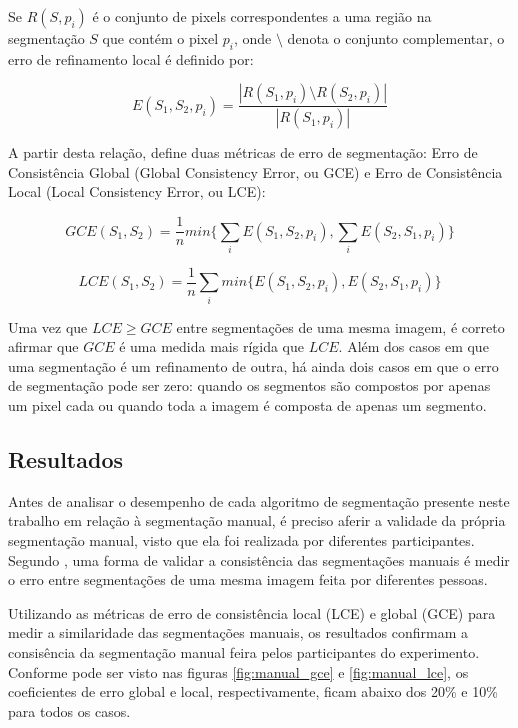 Se $R(S,p_i)$ é o conjunto de pixels correspondentes a uma região na segmentação $S$ que contém o pixel $p_i$, onde $\setminus$ denota o conjunto complementar, o erro de refinamento local é definido por:

\begin{equation}
	\displaystyle E(S_1,S_2,p_i) = \frac{|R(S_1,p_i) \setminus R(S_2,p_i)|}{|R(S_1,p_i)|}
\end{equation}


A partir desta relação,  define duas métricas de erro de segmentação: Erro de Consistência Global (Global Consistency Error, ou GCE) e Erro de Consistência Local (Local Consistency Error, ou LCE):

\begin{equation}
	\displaystyle GCE(S_1,S_2) = \frac{1}{n} min \biggl\{ \sum_{i} E(S_1,S_2,p_i), \sum_{i} E(S_2,S_1,p_i) \biggr\}
\end{equation}

\begin{equation}
	\displaystyle LCE(S_1,S_2) = \frac{1}{n} \sum_{i} min \biggl\{ E(S_1,S_2,p_i), E(S_2,S_1,p_i) \biggr\}
\end{equation}

Uma vez que $LCE \geq GCE$ entre segmentações de uma mesma imagem, é correto afirmar que $GCE$ é uma medida mais rígida que $LCE$. Além dos casos em que uma segmentação é um refinamento de outra, há ainda dois casos em que o erro de segmentação pode ser zero: quando os segmentos são compostos por apenas um pixel cada ou quando toda a imagem é composta de apenas um segmento.

\subsection{Resultados}

Antes de analisar o desempenho de cada algoritmo de segmentação presente neste trabalho em relação à segmentação manual, é preciso aferir a validade da própria segmentação manual, visto que ela foi realizada por diferentes participantes. Segundo , uma forma de validar a consistência das segmentações manuais é medir o erro entre segmentações de uma mesma imagem feita por diferentes pessoas.

Utilizando as métricas de erro de consistência local (LCE) e global (GCE) para medir a similaridade das segmentações manuais, os resultados confirmam a consisência da segmentação manual feira pelos participantes do experimento. Conforme pode ser visto nas figuras \ref{fig:manual_gce} e \ref{fig:manual_lce}, os coeficientes de erro global e local, respectivamente, ficam abaixo dos 20\% e 10\% para todos os casos.

